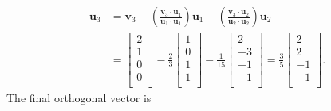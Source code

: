 \begin{align}
  \mathbf{u}_3 &= \mathbf{v}_3 - \left( \frac{ \mathbf{v}_3 \cdot \mathbf{u}_1 }{ \mathbf{u}_1 \cdot \mathbf{u}_1 } \right) \mathbf{u}_1 
                               - \left( \frac{ \mathbf{v}_3 \cdot \mathbf{u}_2 }{ \mathbf{u}_2 \cdot \mathbf{u}_2 } \right) \mathbf{u}_2 \nonumber \\
   &= \left[ \begin{array}{c} 2 \\  1 \\  0 \\  0 \\ \end{array} \right] 
   - \frac{2}{3}  \left[ \begin{array}{c}  1 \\  0 \\   1 \\  1 \\ \end{array} \right]
   - \frac{1}{15} \left[ \begin{array}{c}  2 \\ -3 \\  -1 \\ -1 \\ \end{array} \right] 
    = \frac{3}{5} \left[ \begin{array}{c}  2 \\  2 \\  -1 \\ -1 \\ \end{array} \right] .
\end{align}
The final orthogonal vector is
